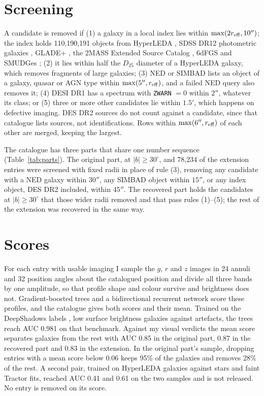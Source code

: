 \documentclass{aastex701}
\begin{document}
\section{Screening}

A candidate is removed if (1) a galaxy in a local index lies within
$\max(2r_{\rm eff}, 10'')$; the index holds 110,190,191 objects from HyperLEDA
\citep{makarov2014}, SDSS DR12 photometric galaxies \citep{alam2015}, GLADE+
\citep{dalya2022}, the 2MASS Extended Source Catalog \citep{jarrett2000}, 6dFGS
\citep{jones2009} and SMUDGes \citep{zaritsky2023}; (2) it lies within half the
$D_{25}$ diameter of a HyperLEDA galaxy, which removes fragments of large
galaxies; (3) NED or SIMBAD \citep{wenger2000} lists an object of a galaxy,
quasar or AGN type within $\max(5'', r_{\rm eff})$, and a failed NED query also
removes it; (4) DESI DR1 \citep{desidr1} has a spectrum with \texttt{ZWARN}
$= 0$ within $2''$, whatever its class; or (5) three or more other candidates lie
within $1.5'$, which happens on defective imaging. DES DR2 sources
\citep{abbott2021des} do not count against a candidate, since that catalogue
lists sources, not identifications. Rows within $\max(6'', r_{\rm eff})$ of each
other are merged, keeping the largest.

The catalogue has three parts that share one number sequence
(Table~\ref{tab:parts}). The original part, at $|b| \ge 30^\circ$, and
78,234 of the extension entries were screened with fixed radii in place of
rule (3), removing any candidate with a NED galaxy within $30''$, any SIMBAD
object within $15''$, or any index object, DES DR2 included, within $45''$.
The recovered part holds the candidates at $|b| \ge 30^\circ$ that those wider
radii removed and that pass rules (1)--(5); the rest of the extension was
recovered in the same way.

\section{Scores}

For each entry with usable imaging I sample the $g$, $r$ and $z$ images in 24
annuli and 32 position angles about the catalogued position and divide all three
bands by one amplitude, so that profile shape and colour survive and brightness
does not. Gradient-boosted trees and a bidirectional recurrent network score
these profiles, and the catalogue gives both scores and their mean. Trained on
the DeepShadows labels \citep{tanoglidis2021}, low surface brightness galaxies
against artefacts, the trees reach AUC 0.981 on that benchmark. Against my
visual verdicts the mean score separates galaxies from the rest with AUC
0.85 in the original part, 0.87 in the recovered part and 0.83 in
the extension. In the original part's sample, dropping entries with a mean score
below 0.06 keeps 95\% of the galaxies and removes 28\% of the rest.
A second pair, trained on HyperLEDA galaxies against stars and
faint Tractor fits, reached AUC 0.41 and 0.61 on the two samples
and is not released. No entry is removed on its score.
\end{document}
